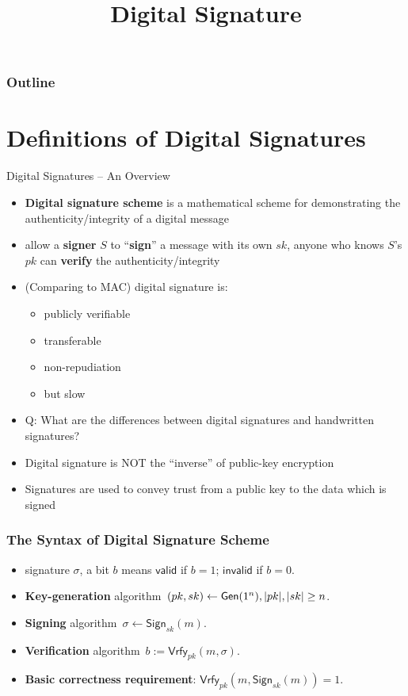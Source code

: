 

\title{Digital Signature}


\maketitle
\begin{frame}
\frametitle{Outline}
\tableofcontents
\end{frame}
\section{Definitions of Digital Signatures}
\begin{frame}{Digital Signatures -- An Overview}
\begin{itemize}
\item \textbf{Digital signature scheme} is a mathematical scheme for demonstrating the authenticity/integrity of a digital message
\item allow a \textbf{signer} $S$ to ``\textbf{sign}'' a message with its own $sk$, anyone who knows $S$'s $pk$ can \textbf{verify} the authenticity/integrity
\item (Comparing to MAC) digital signature is:
\begin{itemize}
\item publicly verifiable
\item transferable
\item non-repudiation
\item but slow
\end{itemize}
\item \alert{Q: What are the differences between digital signatures and handwritten signatures?}
\item Digital signature is NOT the ``inverse'' of public-key encryption
\item Signatures are used to convey trust from a public key to the data which is signed
\end{itemize}
\end{frame}
\begin{frame}\frametitle{The Syntax of Digital Signature Scheme}
\begin{figure}
\begin{center}

\end{center}
\end{figure}
\begin{itemize}
\item signature $\sigma$, a bit $b$ means $\mathsf{valid}$ if $b=1$; $\mathsf{invalid}$ if $b=0$.
\item \textbf{Key-generation} algorithm~$(pk,sk) \gets \mathsf{Gen}(1^n), \lvert pk\rvert,\lvert sk\rvert \ge n$.
\item \textbf{Signing} algorithm~$\sigma \gets \mathsf{Sign}_{sk}(m)$.
\item \textbf{Verification} algorithm~$b:= \mathsf{Vrfy}_{pk}(m,\sigma)$.
\item \textbf{Basic correctness requirement}: $\mathsf{Vrfy}_{pk}(m,\mathsf{Sign}_{sk}(m)) = 1$.
\end{itemize}
\end{frame}
